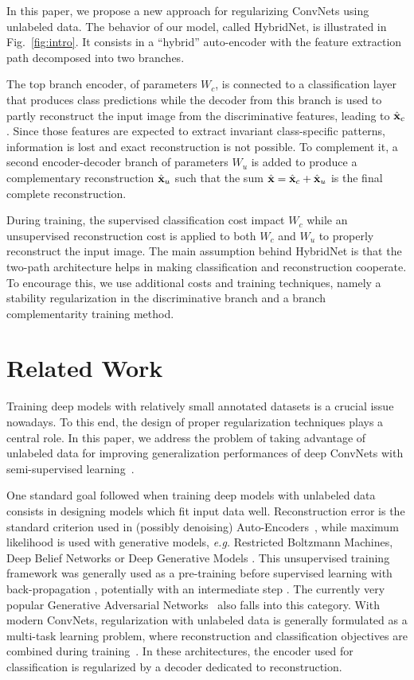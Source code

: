 \documentclass[runningheads]{llncs}
\begin{document}
In this paper, we propose a new approach for regularizing ConvNets using unlabeled data. The behavior of our model, called HybridNet, is illustrated in Fig.~\ref{fig:intro}. It consists in a ``hybrid'' auto-encoder with the feature extraction path decomposed into two branches.

The top branch encoder, of parameters $W_c$, is connected to a classification layer that produces class predictions
while the decoder from this branch is used to partly reconstruct the input image from the discriminative features, leading to $\hat{\mathbf{x}}_c$. Since those features are expected to extract invariant class-specific patterns, information is lost and exact reconstruction is not possible. To complement it, a second encoder-decoder branch of parameters $W_u$ is added to produce a complementary reconstruction $\hat{\mathbf{x}}_u$ such that the sum $\hat{\mathbf{x}} = \hat{\mathbf{x}}_c+\hat{\mathbf{x}}_u$ is the final complete reconstruction.

During training, the supervised classification cost impact $W_c$ while an unsupervised reconstruction cost is applied to both $W_c$ and $W_u$ to properly reconstruct the input image. The main assumption behind HybridNet is that the two-path architecture helps in making classification and reconstruction cooperate. To encourage this, we use additional costs and training techniques, namely a stability regularization in the discriminative branch and a branch complementarity training method.



\section{Related Work}

Training deep models with relatively small annotated datasets is a crucial issue nowadays.
To this end, the design of proper regularization techniques plays a central role.
In this paper, we address the problem of taking advantage of unlabeled data for improving generalization performances of deep ConvNets with semi-supervised learning~\cite{Zhu2005}.

One standard goal followed when training deep models with unlabeled data consists in designing models which fit input data well. Reconstruction error is the standard criterion used in (possibly denoising) Auto-Encoders~\cite{bengio2007greedy,Ranzato2008,Ranzato2007b,vincent2008extracting}, while maximum likelihood is used with generative models, \textit{e.g.} Restricted Boltzmann Machines, Deep Belief Networks or Deep Generative Models \cite{hinton2006reducing,Ranzato2007,Larochelle2008,kingma2014semi}. This unsupervised training framework was generally used as a pre-training before supervised learning with back-propagation \cite{erhan2010does}, potentially with an intermediate step \cite{Goh_NIPS13}. The currently very popular Generative Adversarial Networks~\cite{NIPS2014_5423} also falls into this category. With modern ConvNets, regularization with unlabeled data is generally formulated as a multi-task learning problem, where reconstruction and classification objectives are combined during training~\cite{Zhao2016a,Zhang2016a,Makhzani2016}. In these architectures, the encoder used for classification is regularized by a decoder dedicated to reconstruction.
\end{document}
